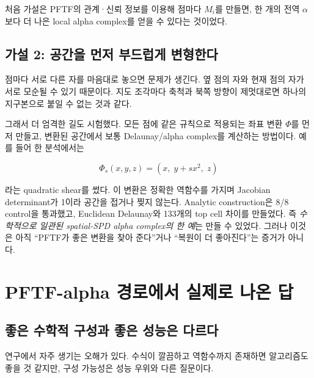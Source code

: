 \documentclass[11pt,a4paper]{article}
\begin{document}
처음 가설은 PFTF의 관계·신뢰 정보를 이용해 점마다 $M_i$를 만들면, 한 개의 전역
$\alpha$보다 더 나은 local alpha complex를 얻을 수 있다는 것이었다.

\subsection{가설 2: 공간을 먼저 부드럽게 변형한다}

점마다 서로 다른 자를 마음대로 놓으면 문제가 생긴다. 옆 점의 자와 현재 점의 자가
서로 모순될 수 있기 때문이다. 지도 조각마다 축척과 북쪽 방향이 제멋대로면 하나의
지구본으로 붙일 수 없는 것과 같다.

그래서 더 엄격한 길도 시험했다. 모든 점에 같은 규칙으로 적용되는 좌표 변환
$\Phi$를 먼저 만들고, 변환된 공간에서 보통 Delaunay/alpha complex를 계산하는
방법이다. 예를 들어 한 분석에서는

\begin{equation}
\Phi_s(x,y,z)=(x,\;y+s x^2,\;z)
\end{equation}

라는 quadratic shear를 썼다. 이 변환은 정확한 역함수를 가지며 Jacobian
determinant가 1이라 공간을 접거나 찢지 않는다. Analytic construction은
8/8 control을 통과했고, Euclidean Delaunay와 133개의 top cell 차이를 만들었다.
즉 \emph{수학적으로 일관된 spatial-SPD alpha complex의 한 예}는 만들 수 있었다.
그러나 이것은 아직 ``PFTF가 좋은 변환을 찾아 준다''거나 ``복원이 더 좋아진다''는
증거가 아니다.

\section{PFTF-alpha 경로에서 실제로 나온 답}

\subsection{좋은 수학적 구성과 좋은 성능은 다르다}

연구에서 자주 생기는 오해가 있다. 수식이 깔끔하고 역함수까지 존재하면 알고리즘도
좋을 것 같지만, 구성 가능성은 성능 우위와 다른 질문이다.
\end{document}

